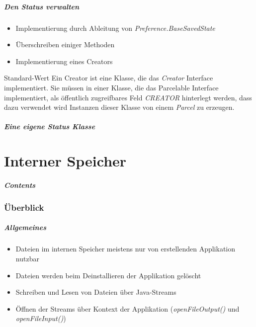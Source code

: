 \begin{frame}
   \frametitle{Den Status verwalten}
   \begin{itemize}
      \item Implementierung durch Ableitung von \emph{Preference.BaseSavedState}
      \item Überschreiben einiger Methoden
      \item Implementierung eines Creators
   \end{itemize}

   \begin{alertblock}{Standard-Wert}
      Ein Creator ist eine Klasse, die das \emph{Creator} Interface implementiert. 
      Sie müssen in einer Klasse, die das Parcelable Interface implementiert, als 
      öffentlich zugreifbares Feld \emph{CREATOR} hinterlegt werden, dass dazu verwendet wird 
      Instanzen dieser Klasse von einem \emph{Parcel} zu erzeugen.
   \end{alertblock}
\end{frame}

\begin{frame}
   \frametitle{Eine eigene Status Klasse}
   
\end{frame}

\part{Interner Speicher}
\frame{\partpage}
\begin{frame}
	\frametitle{Contents}
	\tableofcontents[]
\end{frame}

\section{Überblick}
\begin{frame}
   \frametitle{Allgemeines}
   \begin{itemize}
      \item Dateien im internen Speicher meistens nur von erstellenden Applikation 
      	nutzbar
      \item Dateien werden beim Deinstallieren der Applikation gelöscht
      \item Schreiben und Lesen von Dateien über Java-Streams
      \item Öffnen der Streams über Kontext der Applikation (\emph{openFileOutput()} und 
			\emph{openFileInput()})
   \end{itemize}
\end{frame}

